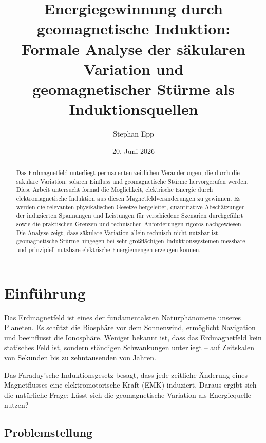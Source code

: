 ﻿\documentclass[a4paper,12pt]{article}
\title{Energiegewinnung durch geomagnetische Induktion:\\
Formale Analyse der s\"akularen Variation und\\
geomagnetischer St\"urme als Induktionsquellen}
\author{Stephan Epp}
\date{20. Juni 2026}
\theoremstyle{definition}
\begin{document}
\maketitle

\begin{abstract}
Das Erdmagnetfeld unterliegt permanenten zeitlichen Ver\"anderungen, die durch
die s\"akulare Variation, solaren Einfluss und geomagnetische St\"urme
hervorgerufen werden. Diese Arbeit untersucht formal die M\"oglichkeit,
elektrische Energie durch elektromagnetische Induktion aus diesen Magnetfeldver\"ander\-ungen zu gewinnen.
Es werden die relevanten physikalischen Gesetze hergeleitet, quantitative Absch\"atzungen
der induzierten Spannungen und Leistungen f\"ur verschiedene Szenarien durchgef\"uhrt
sowie die praktischen Grenzen und technischen Anforderungen rigoros nachgewiesen.
Die Analyse zeigt, dass s\"akulare Variation allein technisch nicht nutzbar ist,
geomagnetische St\"urme hingegen bei sehr gro{\ss}fl\"achigen Induktionssystemen
messbare und prinzipiell nutzbare elektrische Energiemengen erzeugen k\"onnen.
\end{abstract}

\tableofcontents
\newpage

\section{Einf\"uhrung}

Das Erdmagnetfeld ist eines der fundamentalsten Naturph\"anomene unseres Planeten.
Es sch\"utzt die Biosph\"are vor dem Sonnenwind, erm\"oglicht Navigation und
beeinflusst die Ionosph\"are. Weniger bekannt ist, dass das Erdmagnetfeld kein
statisches Feld ist, sondern st\"andigen Schwankungen unterliegt -- auf Zeitskalen
von Sekunden bis zu zehntausenden von Jahren.

Das Faraday'sche Induktionsgesetz besagt, dass jede zeitliche \"Anderung eines
Magnetflusses eine elektromotorische Kraft (EMK) induziert. Daraus ergibt sich
die nat\"urliche Frage: L\"asst sich die geomagnetische Variation als Energiequelle nutzen?

\subsection{Problemstellung}
\end{document}
